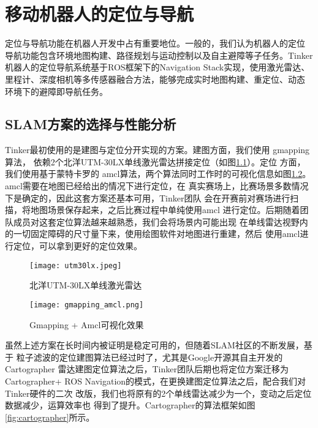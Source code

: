 \chapter{移动机器人的定位与导航}
\label{cha:chapter03}

定位与导航功能在机器人开发中占有重要地位。一般的，我们认为机器人的定位
导航功能包含环境地图构建、路径规划与运动控制以及自主避障等子任务。Tinker
机器人的定位导航系统基于ROS框架下的Navigation Stack实现，使用激光雷达、
里程计、深度相机等多传感器融合方法，能够完成实时地图构建、重定位、动态
环境下的避障即导航任务。


\section{SLAM方案的选择与性能分析}

Tinker最初使用的是建图与定位分开实现的方案。建图方面，我们使用
gmapping算法\cite{grisettiyz2005improving}，
依赖2个北洋UTM-30LX单线激光雷达拼接定位（如图\ref{fig:utm30lx}）。定位
方面，我们使用基于蒙特卡罗的
amcl算法\cite{fox2002kld}，两个算法同时工作时的可视化信息如图\ref{fig:gmapping_amcl}。
amcl需要在地图已经给出的情况下进行定位，在
真实赛场上，比赛场景多数情况下是确定的，因此这套方案还基本可用，Tinker团队
会在开赛前对赛场进行扫描，将地图场景保存起来，之后比赛过程中单纯使用amcl
进行定位。后期随着团队成员对这套定位算法越来越熟悉，我们会将场景内可能出现
在单线雷达视野内的一切固定障碍的尺寸量下来，使用绘图软件对地图进行重建，然后
使用amcl进行定位，可以拿到更好的定位效果。

\begin{figure}
  \centering
  \texttt{[image: utm30lx.jpeg]}
  \caption{北洋UTM-30LX单线激光雷达}
  \label{fig:utm30lx}
\end{figure}


\begin{figure}
  \centering
  \texttt{[image: gmapping\_amcl.png]}
  \caption{Gmapping + Amcl可视化效果}
  \label{fig:gmapping_amcl}
\end{figure}

虽然上述方案在长时间内被证明是稳定可用的，但随着SLAM社区的不断发展，基于
粒子滤波的定位建图算法已经过时了，尤其是Google开源其自主开发的Cartographer
雷达建图定位算法\cite{hess2016real}之后，Tinker团队后期也将定位方案迁移为Cartographer+
ROS Navigation的模式，在更换建图定位算法之后，配合我们对Tinker硬件的二次
改版，我们也将原有的2个单线雷达减少为一个，变动之后定位数据减少，运算效率也
得到了提升。Cartographer的算法框架如图\ref{fig:cartographer}所示。

